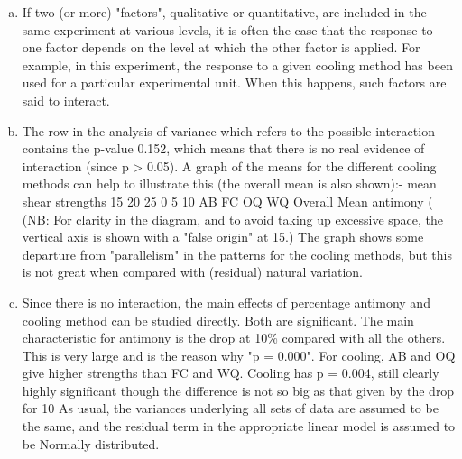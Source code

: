 \documentclass[a4paper,12pt]{article}
\begin{document}
\begin{enumerate}[(a)]
\item  If two (or more) "factors", qualitative or quantitative, are included in the same
experiment at various levels, it is often the case that the response to one factor
depends on the level at which the other factor is applied. For example, in this
experiment, the response to a given %
cooling method has been used for a particular experimental unit. When this happens,
such factors are said to interact.
\item The row in the analysis of variance which refers to the possible interaction
contains the p-value 0.152, which means that there is no real evidence of interaction
(since p > 0.05). A graph of the means for the different cooling methods can help to
illustrate this (the overall mean is also shown):-
mean shear strengths
15
20
25
0 5 10
AB
FC
OQ
WQ
Overall Mean
antimony (%
(NB: For clarity in the diagram, and to avoid taking up excessive space, the vertical axis is shown with a
"false origin" at 15.)
The graph shows some departure from "parallelism" in the patterns for the cooling
methods, but this is not great when compared with (residual) natural variation.
\item Since there is no interaction, the main effects of percentage antimony and cooling
method can be studied directly. Both are significant. The main characteristic for %
antimony is the drop at 10\% compared with all the others. This is very large and is
the reason why "p = 0.000". For cooling, AB and OQ give higher strengths than FC
and WQ. Cooling has p = 0.004, still clearly highly significant though the difference
is not so big as that given by the drop for 10%
As usual, the variances underlying all sets of data are assumed to be the same, and the
residual term in the appropriate linear model is assumed to be Normally distributed.
\end{enumerate}
\end{document}

